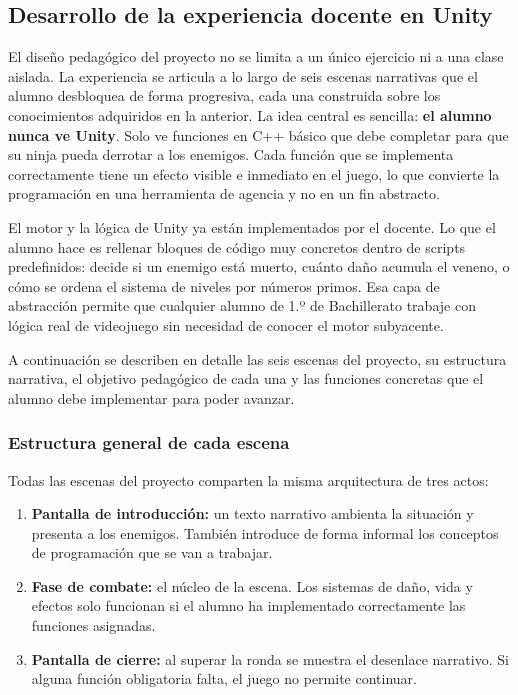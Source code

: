 \documentclass[a4paper,12pt]{article}
\begin{document}
\subsection{Desarrollo de la experiencia docente en Unity}

El diseño pedagógico del proyecto no se limita a un único ejercicio ni a una clase
aislada. La experiencia se articula a lo largo de seis escenas narrativas que el
alumno desbloquea de forma progresiva, cada una construida sobre los conocimientos
adquiridos en la anterior. La idea central es sencilla: \textbf{el alumno nunca ve
Unity}. Solo ve funciones en C++ básico que debe completar para que su ninja pueda
derrotar a los enemigos. Cada función que se implementa correctamente tiene un efecto
visible e inmediato en el juego, lo que convierte la programación en una herramienta
de agencia y no en un fin abstracto.

El motor y la lógica de Unity ya están implementados por el docente. Lo que el alumno
hace es rellenar bloques de código muy concretos dentro de scripts predefinidos:
decide si un enemigo está muerto, cuánto daño acumula el veneno, o cómo se ordena el
sistema de niveles por números primos. Esa capa de abstracción permite que cualquier
alumno de 1.º de Bachillerato trabaje con lógica real de videojuego sin necesidad de
conocer el motor subyacente.

A continuación se describen en detalle las seis escenas del proyecto, su estructura
narrativa, el objetivo pedagógico de cada una y las funciones concretas que el alumno
debe implementar para poder avanzar.

\subsubsection{Estructura general de cada escena}

Todas las escenas del proyecto comparten la misma arquitectura de tres actos:

\begin{enumerate}
  \item \textbf{Pantalla de introducción:} un texto narrativo ambienta la situación
    y presenta a los enemigos. También introduce de forma informal los conceptos de
    programación que se van a trabajar.
  \item \textbf{Fase de combate:} el núcleo de la escena. Los sistemas de daño, vida
    y efectos solo funcionan si el alumno ha implementado correctamente las funciones
    asignadas.
  \item \textbf{Pantalla de cierre:} al superar la ronda se muestra el desenlace
    narrativo. Si alguna función obligatoria falta, el juego no permite continuar.
\end{enumerate}
\end{document}
